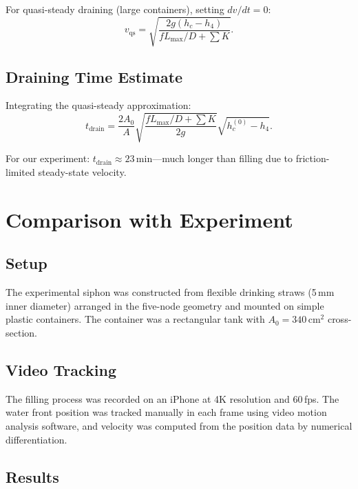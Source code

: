 \documentclass[11pt,a4paper]{article}
\theoremstyle{definition}
\begin{document}
For quasi-steady draining (large containers), setting $dv/dt = 0$:
\begin{equation}
  v_{\text{qs}} = \sqrt{\frac{2g(h_c - h_4)}{fL_{\max}/D + \sum K}}.
  \label{eq:quasi-steady}
\end{equation}

\subsection{Draining Time Estimate}

Integrating the quasi-steady approximation:
\begin{equation}
  t_{\text{drain}} = \frac{2A_0}{A}\sqrt{\frac{fL_{\max}/D + \sum K}{2g}}\sqrt{h_c^{(0)} - h_4}.
  \label{eq:drain-time}
\end{equation}

For our experiment: $t_{\text{drain}} \approx 23$\,min---much longer than filling due to friction-limited steady-state velocity.

\section{Comparison with Experiment}
\label{sec:experiments}

\subsection{Setup}

The experimental siphon was constructed from flexible drinking straws (5\,mm inner diameter) arranged in the five-node geometry and mounted on simple plastic containers. The container was a rectangular tank with $A_0 = 340\,\text{cm}^2$ cross-section.

\subsection{Video Tracking}

The filling process was recorded on an iPhone at 4K resolution and 60\,fps. The water front position was tracked manually in each frame using video motion analysis software, and velocity was computed from the position data by numerical differentiation.

\subsection{Results}
\end{document}
